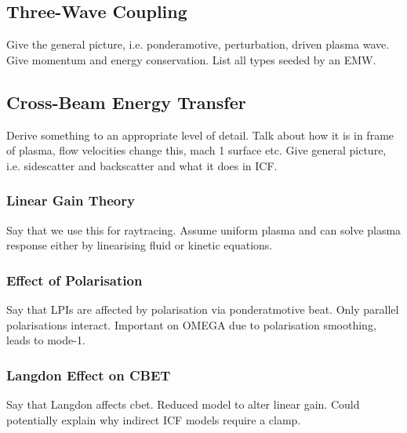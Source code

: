 \subsection{Three-Wave Coupling}%
\label{sec:theory_threewave}

Give the general picture, i.e. ponderamotive, perturbation, driven plasma wave.
Give momentum and energy conservation.
List all types seeded by an EMW.

\subsection{Cross-Beam Energy Transfer}%
\label{sec:theory_CBET}

Derive something to an appropriate level of detail.
Talk about how it is in frame of plasma, flow velocities change this, mach 1 surface etc.
Give general picture, i.e. sidescatter and backscatter and what it does in ICF.


\subsubsection{Linear Gain Theory}%
\label{sec:theory_lineargaincbet}

Say that we use this for raytracing.
Assume uniform plasma and can solve plasma response either by linearising fluid or kinetic equations.

\subsubsection{Effect of Polarisation}%
\label{sec:theory_cbet_polarisation}

Say that LPIs are affected by polarisation via ponderatmotive beat.
Only parallel polarisations interact.
Important on OMEGA due to polarisation smoothing, leads to mode-1.

\subsubsection{Langdon Effect on CBET}%
\label{sec:theory_cbet_langdon}

Say that Langdon affects cbet.
Reduced model to alter linear gain.
Could potentially explain why indirect ICF models require a clamp.

